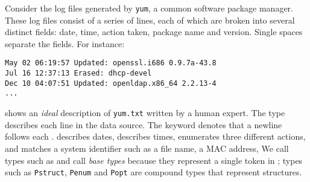 
Consider
the log files generated by {\tt yum}, a common software package manager.
These log files consist of a series of lines,
each of which are broken into several distinct fields: 
date, time, action taken, package name and version. 
Single spaces separate the fields.  For instance:
{\small\begin{verbatim}
May 02 06:19:57 Updated: openssl.i686 0.9.7a-43.8
Jul 16 12:37:13 Erased: dhcp-devel
Dec 10 04:07:51 Updated: openldap.x86_64 2.2.13-4
...
\end{verbatim}}
\normalsize
%
%
%

 shows an {\em ideal} \pads{} description of
{\tt yum.txt} written by a human expert.
The  type describes each line in the data source.
The keyword  denotes that a newline follows each .
 describes dates,  describes times, 
 enumerates three different actions,
and  matches a system identifier such as a file
name, a MAC address, \etc{} We call types such as  and 
call {\em base types} because they represent a single token 
in \pads{}; types such as {\tt Pstruct}, {\tt Penum} and {\tt Popt} are 
compound types that represent
structures. 

